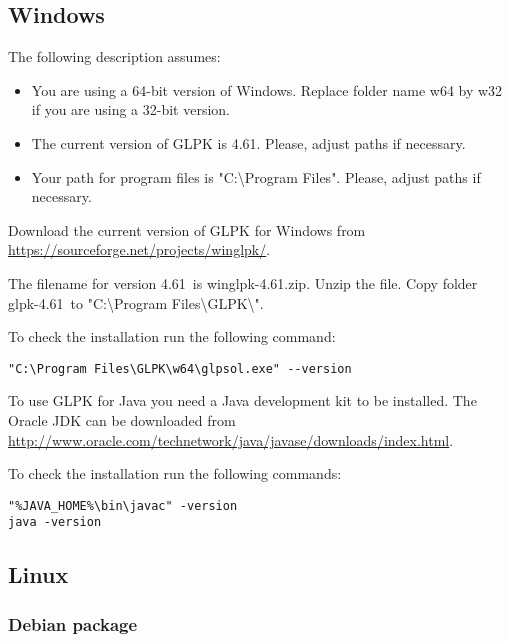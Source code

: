 \documentclass[a4paper,11pt]{report}
\newcommand{\glpkVersionMajor}{4}
\newcommand{\glpkVersionMinor}{61}
\begin{document}
\subsection{Windows}

The following description assumes:

\begin{itemize}
\item You are using a 64-bit version of Windows. Replace folder name w64 by w32
if you are using a 32-bit version.
\item The current version of GLPK is \glpkVersionMajor.\glpkVersionMinor.
Please, adjust paths if necessary.
\item Your path for program files is "C:\textbackslash Program Files".
Please, adjust paths if necessary.
\end{itemize}

Download the current version of GLPK for Windows from
\href{https://sourceforge.net/projects/winglpk/}{https://sourceforge.net/projects/winglpk/}.

The filename for version \glpkVersionMajor.\glpkVersionMinor\ is
winglpk-\glpkVersionMajor.\glpkVersionMinor.zip. Unzip the file. Copy folder
glpk-\glpkVersionMajor.\glpkVersionMinor\ to
"C:\textbackslash Program Files\textbackslash GLPK\textbackslash ".

To check the installation run the following command:

\begin{lstlisting}
"C:\Program Files\GLPK\w64\glpsol.exe" --version
\end{lstlisting}

To use GLPK for Java you need a Java development kit to be installed.
The Oracle JDK can be downloaded from
\href{http://www.oracle.com/technetwork/java/javase/downloads/index.html}{http://www.oracle.com/technetwork/java/javase/downloads/index.html}.

To check the installation run the following commands:

\begin{lstlisting}
"%JAVA_HOME%\bin\javac" -version
java -version
\end{lstlisting}

\subsection{Linux}
\subsubsection{Debian package}
\end{document}
